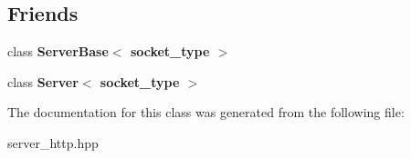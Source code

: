 \subsection*{Friends}
\begin{DoxyCompactItemize}
\item 
class {\bfseries Server\+Base$<$ socket\+\_\+type $>$}\hypertarget{a00249_a01d54a7e16ca437c98ec571deca98dfc}{}\label{a00249_a01d54a7e16ca437c98ec571deca98dfc}

\item 
class {\bfseries Server$<$ socket\+\_\+type $>$}\hypertarget{a00249_a3f155064c0074d68a408aa3193ca1666}{}\label{a00249_a3f155064c0074d68a408aa3193ca1666}

\end{DoxyCompactItemize}


The documentation for this class was generated from the following file\+:\begin{DoxyCompactItemize}
\item 
server\+\_\+http.\+hpp\end{DoxyCompactItemize}
